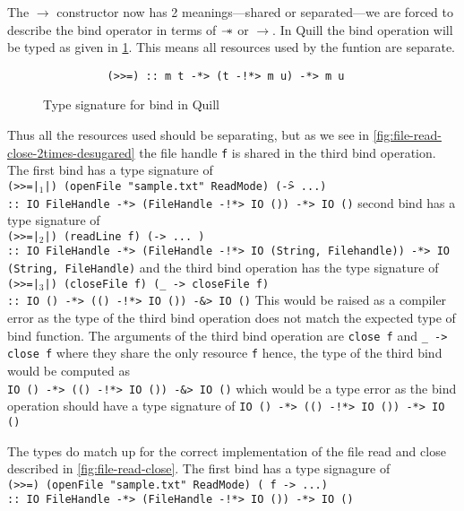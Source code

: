 The $\rightarrow$ constructor now has 2 meanings---shared or separated---we are
forced to describe the bind operator in terms of $\mathrel{-\mkern-6mu*}$ or $\rightarrow$. In Quill the bind operation will
be typed as given in \cref{fig:quill-bind-type}. This means all resources used by the funtion are separate.
\begin{figure}[h]
  \begin{framed}
    \begin{verbatim}
          (>>=) :: m t -*> (t -!*> m u) -*> m u
    \end{verbatim}
  \end{framed}
  \caption{Type signature for bind in Quill}
  \label{fig:quill-bind-type}
\end{figure}
Thus all the resources used should be separating, but as we see in \cref{fig:file-read-close-2times-desugared} the file handle
\texttt{f} is shared in the third bind operation. The first bind has a type signature of\\
\texttt{(>>=|$_1$|) (openFile "sample.txt" ReadMode) (\f -> ...)}\\
\texttt{:: IO FileHandle -*> (FileHandle -!*> IO ()) -*> IO ()}
second bind has a type signature of\\
\texttt{(>>=|$_2$|) (readLine f) (\s -> ... )}\\
\texttt{:: IO FileHandle -*> (FileHandle -!*> IO (String, Filehandle)) -*> IO (String, FileHandle)}
and the third bind operation has the type signature of\\
\texttt{(>>=|$_3$|) (closeFile f) (\_ -> closeFile f)}\\
\texttt{:: IO () -*> (() -!*> IO ()) -&> IO ()}
This would be raised as a compiler error as the type of the third bind operation does
not match the expected type of bind function.
The arguments of the third bind operation are \texttt{close f}
and \texttt{\_ -> close f} where they share the only resource \texttt{f} hence,
the type of the third bind would be computed as \\
\texttt{IO () -*> (() -!*> IO ()) -&> IO ()} which would be a type error
as the bind operation should have a type signature of
\texttt{IO () -*> (() -!*> IO ()) -*> IO ()}

The types do match up for the correct implementation of the file read and close described in \cref{fig:file-read-close}.
The first bind has a type signagure of\\
\texttt{(>>=) (openFile "sample.txt" ReadMode) (\ f -> ...)}\\
\texttt{:: IO FileHandle -*> (FileHandle -!*> IO ()) -*> IO ()}

